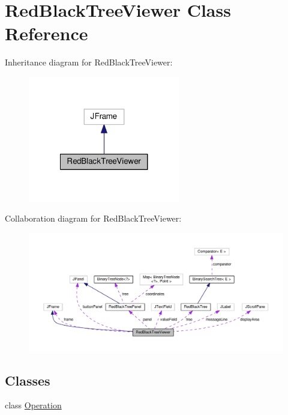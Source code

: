 \hypertarget{class_red_black_tree_viewer}{}\section{Red\+Black\+Tree\+Viewer Class Reference}
\label{class_red_black_tree_viewer}


Inheritance diagram for Red\+Black\+Tree\+Viewer\+:
\nopagebreak
\begin{figure}[H]
\begin{center}
\leavevmode
\includegraphics[width=188pt]{class_red_black_tree_viewer__inherit__graph}
\end{center}
\end{figure}


Collaboration diagram for Red\+Black\+Tree\+Viewer\+:
\nopagebreak
\begin{figure}[H]
\begin{center}
\leavevmode
\includegraphics[width=350pt]{class_red_black_tree_viewer__coll__graph}
\end{center}
\end{figure}
\subsection*{Classes}
\begin{DoxyCompactItemize}
\item 
class \hyperlink{class_red_black_tree_viewer_1_1_operation}{Operation}
\end{DoxyCompactItemize}
